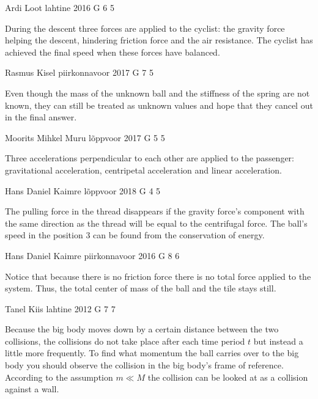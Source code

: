 \documentclass[11pt]{article}
\begin{document}
{Ardi Loot} %
{lahtine} %
{2016} %
{G 6} %
{5} %
{

\ifEngHint
During the descent three forces are applied to the cyclist: the gravity force helping the descent, hindering friction force and the air resistance. The cyclist has achieved the final speed when these forces have balanced.
\fi
}

{Rasmus Kisel} %
{piirkonnavoor} %
{2017} %
{G 7} %
{5} %
{

\ifEngHint
Even though the mass of the unknown ball and the stiffness of the spring are not known, they can still be treated as unknown values and hope that they cancel out in the final answer.
\fi
}

{Moorits Mihkel Muru} %
{lõppvoor} %
{2017} %
{G 5} %
{5} %
{

\ifEngHint
Three accelerations perpendicular to each other are applied to the passenger: gravitational acceleration, centripetal acceleration and linear acceleration.
\fi
}

{Hans Daniel Kaimre} %
{lõppvoor} %
{2018} %
{G 4} %
{5} %
{

\ifEngHint
The pulling force in the thread disappears if the gravity force’s component with the same direction as the thread will be equal to the centrifugal force. The ball’s speed in the position 3 can be found from the conservation of energy.
\fi
}

{Hans Daniel Kaimre} %
{piirkonnavoor} %
{2016} %
{G 8} %
{6} %
{

\ifEngHint
Notice that because there is no friction force there is no total force applied to the system. Thus, the total center of mass of the ball and the tile stays still.
\fi
}

{Tanel Kiis} %
{lahtine} %
{2012} %
{G 7} %
{7} %
{

\ifEngHint
Because the big body moves down by a certain distance between the two collisions, the collisions do not take place after each time period $t$ but instead a little more frequently. To find what momentum the ball carries over to the big body you should observe the collision in the big body’s frame of reference. According to the assumption $m\ll M$ the collision can be looked at as a collision against a wall.
\fi
}
\end{document}
